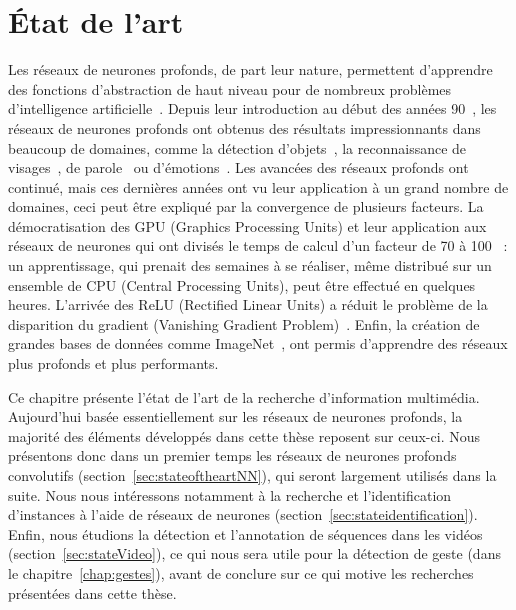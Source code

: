 \chapter{État de l'art}
\label{chap:stateoftheart}

\begin{sloppypar}
Les réseaux de neurones profonds, de part leur nature, permettent d'apprendre des fonctions d'abstraction de haut niveau pour de nombreux problèmes d'intelligence artificielle~\cite{bengio2009learning}.
Depuis leur introduction au début des années 90~\cite{lecun1989backpropagation}, les réseaux de neurones profonds ont obtenus des résultats impressionnants dans beaucoup de domaines, comme la détection d'objets~\cite{huang2017densely, yolov3, ren2015faster}, la reconnaissance de visages~\cite{schroff2015facenet}, de parole~\cite{osako2015complex,amodei2016deep} ou d'émotions~\cite{nakov2016semeval}.
Les avancées des réseaux profonds ont continué, mais ces dernières années ont vu leur application à un grand nombre de domaines, ceci peut être expliqué par la convergence de plusieurs facteurs. 
La démocratisation des GPU (Graphics Processing Units) et leur application aux réseaux de neurones qui ont divisés le temps de calcul d'un facteur de 70 à 100~\cite{raina2009large} : un apprentissage, qui prenait des semaines à se réaliser, même distribué sur un ensemble de CPU (Central Processing Units), peut être effectué en quelques heures.
L'arrivée des ReLU (Rectified Linear Units) a réduit le problème de la disparition du gradient (Vanishing Gradient Problem)~\cite{glorot2011deep}. 
Enfin, la création de grandes bases de données comme ImageNet~\cite{deng2009imagenet}, ont permis d'apprendre des réseaux plus profonds et plus performants.
\end{sloppypar}

Ce chapitre présente l'état de l'art de la recherche d'information multimédia.
Aujourd'hui basée essentiellement sur les réseaux de neurones profonds, la majorité des éléments développés dans cette thèse reposent sur ceux-ci.
Nous présentons donc dans un premier temps les réseaux de neurones profonds convolutifs (section~\ref{sec:stateoftheartNN}), qui seront largement utilisés dans la suite. 
Nous nous intéressons notamment à la recherche et l'identification d'instances à l'aide de réseaux de neurones (section~\ref{sec:stateidentification}).
Enfin, nous étudions la détection et l'annotation de séquences dans les vidéos (section~\ref{sec:stateVideo}), ce qui nous sera utile pour la détection de geste (dans le chapitre~\ref{chap:gestes}), avant de conclure sur ce qui motive les recherches présentées dans cette thèse.





